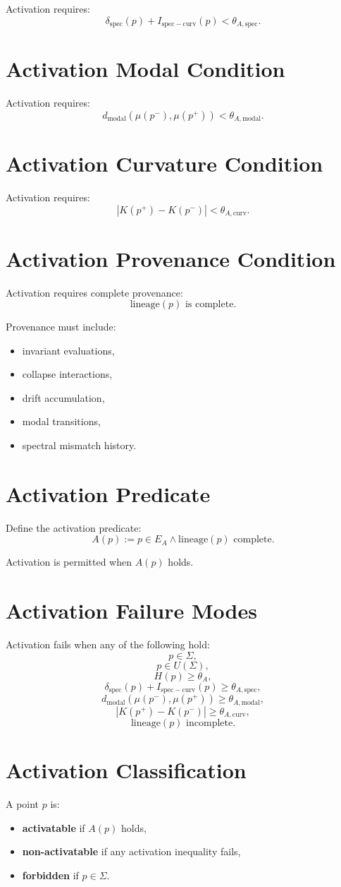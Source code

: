 \documentclass[11pt]{article}
\begin{document}
Activation requires:
\[
\delta_{\mathrm{spec}}(p)
  + I_{\mathrm{spec-curv}}(p)
  < \theta_{A,\mathrm{spec}}.
\]

\section{Activation Modal Condition}

Activation requires:
\[
d_{\mathrm{modal}}(\mu(p^-), \mu(p^+))
  < \theta_{A,\mathrm{modal}}.
\]

\section{Activation Curvature Condition}

Activation requires:
\[
|K(p^+) - K(p^-)| < \theta_{A,\mathrm{curv}}.
\]

\section{Activation Provenance Condition}

Activation requires complete provenance:
\[
\mathrm{lineage}(p) \text{ is complete}.
\]

Provenance must include:
\begin{itemize}
  \item invariant evaluations,
  \item collapse interactions,
  \item drift accumulation,
  \item modal transitions,
  \item spectral mismatch history.
\end{itemize}

\section{Activation Predicate}

Define the activation predicate:
\[
A(p)
  := p \in E_A
     \land \mathrm{lineage}(p) \text{ complete}.
\]

Activation is permitted when $A(p)$ holds.

\section{Activation Failure Modes}

Activation fails when any of the following hold:
\[
p \in \Sigma,
\]
\[
p \in U(\Sigma),
\]
\[
H(p) \ge \theta_A,
\]
\[
\delta_{\mathrm{spec}}(p)
  + I_{\mathrm{spec-curv}}(p)
  \ge \theta_{A,\mathrm{spec}},
\]
\[
d_{\mathrm{modal}}(\mu(p^-), \mu(p^+))
  \ge \theta_{A,\mathrm{modal}},
\]
\[
|K(p^+) - K(p^-)| \ge \theta_{A,\mathrm{curv}},
\]
\[
\mathrm{lineage}(p) \text{ incomplete}.
\]

\section{Activation Classification}

A point $p$ is:
\begin{itemize}
  \item \textbf{activatable} if $A(p)$ holds,
  \item \textbf{non-activatable} if any activation inequality fails,
  \item \textbf{forbidden} if $p \in \Sigma$.
\end{itemize}
\end{document}
